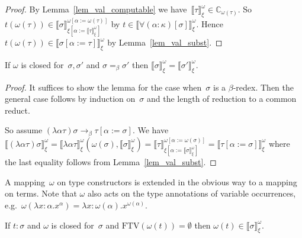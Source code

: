 \documentclass[runningheads,a4paper]{llncs}
\newcommand{\subst}[2]{#1:=#2}
\newcommand{\FTV}{\mathrm{FTV}}
\newcommand{\Cb}{\mathbb{C}}
\newcommand{\val}[3]{\ensuremath{\llbracket#1\rrbracket_{#2}^{#3}}}
\begin{document}
\begin{proof}
  By Lemma~\ref{lem_val_computable} we have~$\val{\tau}{\xi}{\omega}
  \in \Cb_{\omega(\tau)}$. So $t (\omega(\tau)) \in
  \val{\sigma}{\xi[\subst{\alpha}{\val{\tau}{\xi}{\omega}}]}{\omega[\subst{\alpha}{\omega(\tau)}]}$
  by $t \in \val{\forall(\alpha:\kappa)[\sigma]}{\xi}{\omega}$. Hence
  $t (\omega(\tau)) \in
  \val{\sigma[\subst{\alpha}{\tau}]}{\xi}{\omega}$ by
  Lemma~\ref{lem_val_subst}.
\end{proof}


\begin{lemma}\label{lem_beta_val}
  If $\omega$ is closed for~$\sigma,\sigma'$ and $\sigma =_\beta
  \sigma'$ then $\val{\sigma}{\xi}{\omega} =
  \val{\sigma'}{\xi}{\omega}$.
\end{lemma}

\begin{proof}
  It suffices to show the lemma for the case when~$\sigma$ is a
  $\beta$-redex. Then the general case follows by induction
  on~$\sigma$ and the length of reduction to a common reduct.

  So assume $(\lambda\alpha\tau)\sigma \to_\beta
  \tau[\subst{\alpha}{\sigma}]$. We have
  $\val{(\lambda\alpha\tau)\sigma}{\xi}{\omega} =
  \val{\lambda\alpha\tau}{\xi}{\omega}(\omega(\sigma),
  \val{\sigma}{\xi}{\omega}) =
  \val{\tau}{\xi[\subst{\alpha}{\val{\sigma}{\xi}{\omega}}]}{\omega[\subst{\alpha}{\omega(\sigma)}]}
  = \val{\tau[\subst{\alpha}{\sigma}]}{\xi}{\omega}$ where the last
  equality follows from Lemma~\ref{lem_val_subst}.
\end{proof}

A mapping~$\omega$ on type constructors is extended in the obvious way
to a mapping on terms. Note that $\omega$ also acts on the type
annotations of variable occurrences, e.g.~$\omega(\lambda x : \alpha
. x^\alpha) = \lambda x : \omega(\alpha) . x^{\omega(\alpha)}$.

\begin{lemma}\label{lem_typable_computable}
  If $t : \sigma$ and $\omega$ is closed for~$\sigma$ and
  $\FTV(\omega(t)) = \emptyset$ then $\omega(t) \in
  \val{\sigma}{\xi}{\omega}$.
\end{lemma}
\end{document}

